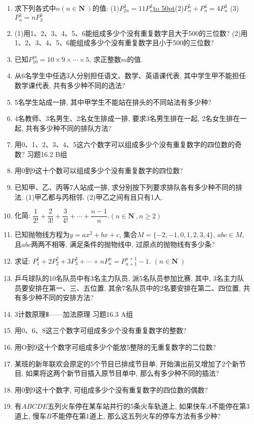 \documentclass[10pt,a4paper]{article}
\newcommand{\blank}[1]{\underline{\hbox to #1pt{}}}
\begin{document}
\begin{enumerate}[1.]
\item 求下列各式中$n(n\in \mathbf{N}^{\cdot })$的值:
(1)$P_{2n}^3=11P_n^3$\blank{50}(2)$P_n^5+P_n^4=4P_n^3$
(3)$P_n^3=nP_3^3$
\item (1)用1、2、3、4、5、6能组成多少个没有重复数字且大于500的三位数?
(2)用1、2、3、4、5、6能组成多少个没有重复数字且小于500的三位数?
\item 已知$P_{10}^m=10\times 9\times \cdots \times 5$, 求正整数$m$的值.
\item 从6名学生中任选3人分别担任语文、数学、英语课代表, 其中学生甲不能担任数学课代表, 共有多少种不同的选法?
\item 5名学生站成一排, 其中甲学生不能站在排头的不同站法有多少种?
\item 4名教师、3名男生、2名女生排成一排, 要求3名男生排在一起, 2名女生排在一起, 共有多少种不同的排队方法?
\item 用0、1、2、3、4、5这六个数字可以组成多少个没有重复数字的四位数的奇数?
习题16.2   B组
\item 用0到9这十个数可以组成多少个没有重复数字的四位数?
\item 已知甲、乙、丙等7人站成一排, 求分别按下列要求排队各有多少种不同的排法.
(1)甲乙都与丙相邻.
(2)甲乙之间有且只有1人.
\item 化简: $\dfrac 1{2!}+\dfrac 2{3!}+\dfrac 3{4!}+\cdots +\dfrac{n-1}n$.$(n\in \mathbf{N}^{\cdot },n\ge 2)$
\item 已知抛物线方程为$y=ax^2+bx+c$, 集合$M=\{-2,-1,0,1,2,3,4\}$, $abc\in M$, 且$abc$两两不相等, 满足条件的抛物线中, 过原点的抛物线有多少条?
\item 求证: $P_1^1+2P_2^2+3P_3^3+\cdots +nP_n^n=P_{n+1}^{n+1}-1$. $(n\in \mathbf{N}^{\cdot })$
\item 乒乓球队的10名队员中有3名主力队员, 派5名队员参加比赛, 其中, 3名主力队员要安排在第一、三、五位置, 其余7名队员中的2名要安排在第二、四位置, 共有多少种不同的安排方法?
\item 3计数原理Ⅱ——加法原理
习题16.3  A组
\item 用0、6、8这三个数字可组成多少个没有重复数字的整数?
\item 用O到9这十个数字可组成多少个能放5整除的无重复数字的二位数?
\item 某班的新年联欢会原定的5个节目已排成节目单, 开始演出前又增加了2个新节目, 如果将这两个新节目插入原节目单中, 那么有多少种不同的插法?
\item 用0到9这十个数字, 可组成多少个没有重复数字的四位数的偶数?
\item 有$ABCDE$五列火车停在某车站并行的5条火车轨道上, 如果快车$A$不能停在第3道上, 慢车$B$不能停在第1道上, 那么这五列火车的停车方法有多少种?

\end{enumerate}
\end{document}
